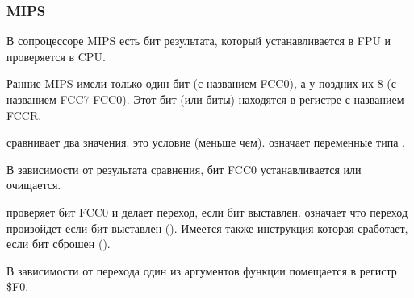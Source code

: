 \subsubsection{MIPS}


В сопроцессоре MIPS есть бит результата, который устанавливается в FPU и проверяется в CPU.

Ранние MIPS имели только один бит (с названием FCC0), а у поздних их 8 (с названием FCC7-FCC0).
Этот бит (или биты) находятся в регистре с названием FCCR.



 сравнивает два значения. 
 это условие  (меньше чем).
 означает переменные типа \Tdouble.

В зависимости от результата сравнения, бит FCC0 устанавливается или очищается.

 проверяет бит FCC0 и делает переход, если бит выставлен.
 означает что переход произойдет если бит выставлен ().
Имеется также инструкция  которая сработает, если бит сброшен ().

В зависимости от перехода один из аргументов функции помещается в регистр \$F0.

